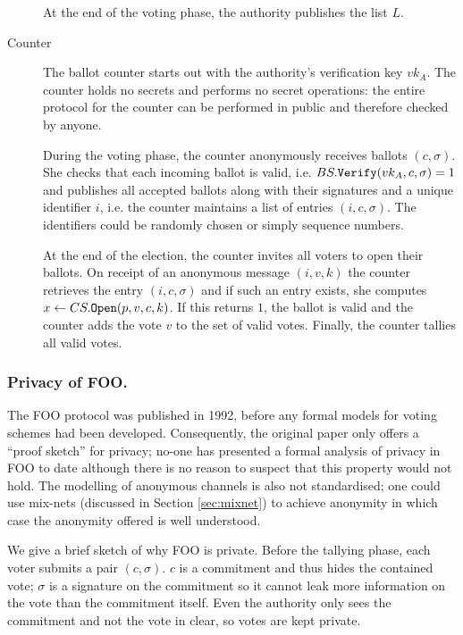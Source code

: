 \documentclass[envcountsame]{llncs}
\newcommand{\alg}[1]{\textup{\texttt{#1}}}
\begin{document}
\begin{description}
At the end of the voting phase, the authority publishes the list $L$.

\item[Counter]
The ballot counter starts out with the authority's verification key $vk_A$.
The counter holds no secrets and performs no secret operations: the entire
protocol for the counter can be performed in public and therefore checked by
anyone.

During the voting phase, the counter anonymously receives ballots $(c, \sigma)$.
She checks that each incoming ballot is valid, i.e. $BS.\alg{Verify}(vk_A, c,
\sigma) = 1$ and publishes all accepted ballots along with their signatures and
a unique identifier $i$, i.e. the counter maintains a list of entries $(i, c,
\sigma)$. The identifiers could be randomly chosen or simply sequence numbers.

At the end of the election, the counter invites all voters to open their
ballots. On receipt of an anonymous message $(i, v, k)$ the counter retrieves
the entry $(i, c, \sigma)$ and if such an entry exists, she computes $x \gets
CS.\alg{Open}(p, v, c, k)$. If this returns $1$, the ballot is valid and the
counter adds the vote $v$ to the set of valid votes. Finally, the counter
tallies all valid votes.
\end{description}

\subsubsection{Privacy of FOO.}

The FOO protocol was published in 1992, before any formal models for voting
schemes had been developed. Consequently, the original paper only offers a
``proof sketch'' for privacy; no-one has presented a formal analysis of privacy
in FOO to date although there is no reason to suspect that this property would
not hold. The modelling of anonymous channels is also not standardised; one
could use mix-nets (discussed in Section \ref{sec:mixnet}) to achieve anonymity
in which case the anonymity offered is well understood.

We give a brief sketch of why FOO is private. Before the tallying phase, each
voter submits a pair $(c, \sigma)$. $c$ is a commitment and thus hides the
contained vote; $\sigma$ is a signature on the commitment so it cannot leak
more information on the vote than the commitment itself. Even the authority
only sees the commitment and not the vote in clear, so votes are kept private.
\end{document}
